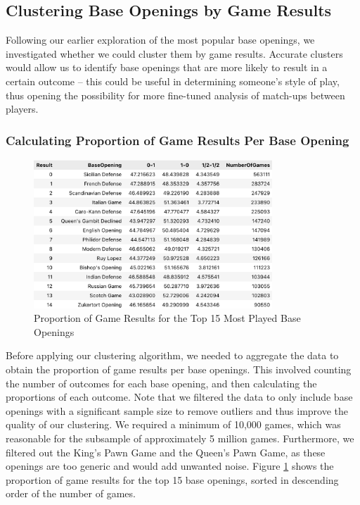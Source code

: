 \documentclass[a4paper, 11pt]{article}
\begin{document}
\subsection{Clustering Base Openings by Game Results}
Following our earlier exploration of the most popular base openings, we investigated whether we could cluster them by game results. Accurate clusters would allow us to identify base openings that are more likely to result in a certain outcome -- this could be useful in determining someone's style of play, thus opening the possibility for more fine-tuned analysis of match-ups between players.

\subsubsection{Calculating Proportion of Game Results Per Base Opening}

\begin{figure}[H]
    \centering
    \caption{Proportion of Game Results for the Top 15 Most Played Base Openings}
    \label{fig:proportionOfGameResultsForTop15BaseOpenings}
    \includegraphics[width=0.8\textwidth]{Proportion of Game Results for Top 15 Base Openings.png}
\end{figure}

Before applying our clustering algorithm, we needed to aggregate the data to obtain the proportion of game results per base openings. This involved counting the number of outcomes for each base opening, and then calculating the proportions of each outcome. Note that we filtered the data to only include base openings with a significant sample size to remove outliers and thus improve the quality of our clustering. We required a minimum of 10,000 games, which was reasonable for the subsample of approximately 5 million games. Furthermore, we filtered out the King's Pawn Game and the Queen's Pawn Game, as these openings are too generic and would add unwanted noise. Figure \ref{fig:proportionOfGameResultsForTop15BaseOpenings} shows the proportion of game results for the top 15 base openings, sorted in descending order of the number of games.
\end{document}
